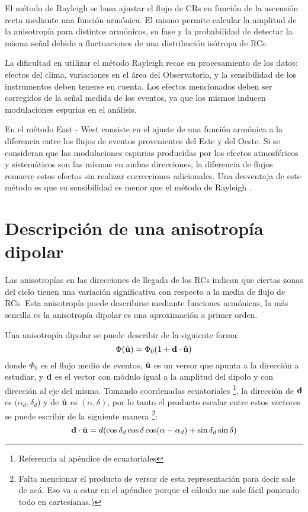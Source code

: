 

El método de Rayleigh se basa ajustar el flujo de CRs en función de la ascensión recta mediante una función armónica. El mismo permite calcular la amplitud de la anisotropía para distintos armónicos, su fase y la probabilidad de detectar la misma señal debido a fluctuaciones de una distribución isótropa de RCs. 

La dificultad en utilizar el método Rayleigh recae en procesamiento de los datos: efectos del clima,  variaciones en el área del Observatorio, y la sensibilidad de los instrumentos deben tenerse en cuenta.  Los efectos mencionados deben ser corregidos de la señal medida de los eventos, ya que los mismos inducen modulaciones espurias en el análisis.

En el método East - West consiste en el ajuste de una función armónica a la diferencia entre los flujos de eventos provenientes del Este y del Oeste. Si se consideran que las modulaciones espurias producidas por los efectos atmosféricos y sistemáticos son las mismas en ambas direcciones, la diferencia de flujos remueve estos efectos sin realizar correcciones adicionales. Una desventaja de este método es que su sensibilidad es menor que el método de Rayleigh \cite{taborda}.


\section{Descripción de una anisotropía dipolar}
Las anisotropías en las direcciones de llegada de los RCs indican que ciertas zonas del cielo tienen una variación significativa con respecto a la media de flujo de RCs. Esta anisotropía puede describirse mediante funciones armónicas, la más sencilla es la anisotropía dipolar es una aproximación a primer orden.

Una anisotropía dipolar se puede describir de la siguiente forma:
\begin{equation}
    \Phi(\hat{\bf{u}}) = \Phi_0(1+\bf{d}\cdot\hat{\bf{u}})
    \label{eq:dipolo_general}
\end{equation}
\noindent donde $\Phi_0$ es el flujo medio de eventos, $\hat{\bf{u}}$ es un versor que apunta a la dirección a estudiar, y $\bf{d}$ es el vector con módulo igual a la amplitud del dipolo y con dirección al eje del mismo. Tomando coordenadas ecuatoriales \footnote{Referencia al apéndice de ecuatoriales}, la dirección de $\bf{d}$ es $(\alpha_d, \delta_d$) y  de $\hat{\bf{u}}$ es $(\alpha, \delta)$, por lo tanto  el producto escalar  entre estos vectores se puede escribir de la siguiente manera \footnote{Falta mencionar el producto de versor de esta representación para decir sale de acá. Eso va a estar en el apéndice porque el cálculo me  sale fácil poniendo  todo en cartesianas.)}:
\begin{equation}
    \textbf{d}\cdot\hat{\bf{u}}= d (\cos\delta_d \cos\delta \cos(\alpha - \alpha_d) + \sin\delta_d  \sin\delta)
    \label{eq:product_ud}
\end{equation}


